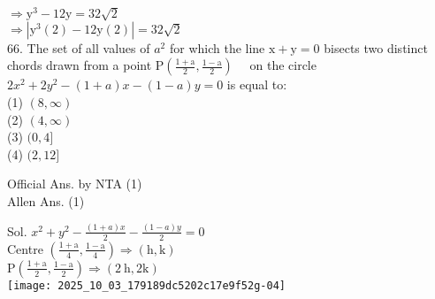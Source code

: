 \documentclass[10pt]{article}
\begin{document}
\(\Rightarrow \mathrm{y}^{3}-12 \mathrm{y}=32 \sqrt{2}\)\\
\(\Rightarrow\left|\mathrm{y}^{3}(2)-12 \mathrm{y}(2)\right|=32 \sqrt{2}\)\\
66. The set of all values of \(a^{2}\) for which the line \(\mathrm{x}+\mathrm{y}=0\) bisects two distinct chords drawn from a point \(\mathrm{P}\left(\frac{1+\mathrm{a}}{2}, \frac{1-\mathrm{a}}{2}\right) \quad\) on the circle \(2 x^{2}+2 y^{2}-(1+a) x-(1-a) y=0\) is equal to:\\
(1) \((8, \infty)\)\\
(2) \((4, \infty)\)\\
(3) \((0,4]\)\\
(4) \((2,12]\)

Official Ans. by NTA (1)\\
Allen Ans. (1)

Sol. \(x^{2}+y^{2}-\frac{(1+a) x}{2}-\frac{(1-a) y}{2}=0\)\\
Centre \(\left(\frac{1+\mathrm{a}}{4}, \frac{1-\mathrm{a}}{4}\right) \Rightarrow(\mathrm{h}, \mathrm{k})\)\\
\(\mathrm{P}\left(\frac{1+\mathrm{a}}{2}, \frac{1-\mathrm{a}}{2}\right) \Rightarrow(2 \mathrm{~h}, 2 \mathrm{k})\)\\
\texttt{[image: 2025\_10\_03\_179189dc5202c17e9f52g-04]}
\end{document}
